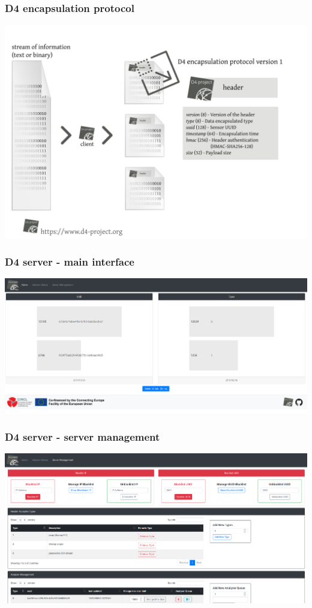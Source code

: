 \documentclass{beamer}
\begin{document}
\begin{frame}
        \frametitle{D4 encapsulation protocol}
        \includegraphics[scale=0.38]{d4-protocol-encapsulation.png}
\end{frame}

\begin{frame}
        \frametitle{D4 server - main interface}
        \includegraphics[scale=0.18]{d4-4.png}
\end{frame}

\begin{frame}
        \frametitle{D4 server - server management}
        \includegraphics[scale=0.18]{d4-3.png}
\end{frame}
\end{document}

